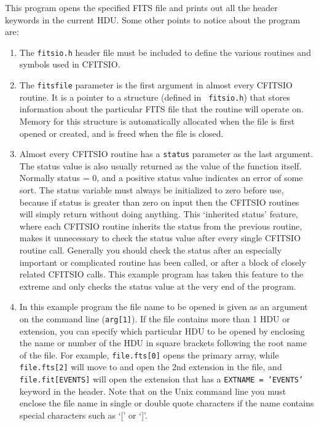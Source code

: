\documentclass[11pt]{article}
\begin{document}
This program opens the specified FITS file and prints
out all the header keywords in the current HDU.
Some other points to notice about the program are:
\begin{enumerate}

\item
The {\tt fitsio.h} header file must be included to define the
various routines and symbols used in CFITSIO.

\item

The {\tt fitsfile}  parameter is the first argument in almost every
CFITSIO routine.  It is a pointer to a structure (defined in {\tt
fitsio.h}) that stores information about the particular FITS file that
the routine will operate on.  Memory for this structure is
automatically allocated when the file is first opened or created, and
is freed when the file is closed.

\item
Almost every CFITSIO routine has a {\tt status} parameter as the last
argument. The status value is also usually returned as the value of the
function itself.  Normally status = 0, and a positive status value
indicates an error of some sort.  The status variable must always be
initialized to zero before use, because if status is greater than zero
on input then the CFITSIO routines will simply return without doing
anything.  This `inherited status' feature, where each CFITSIO routine
inherits the status from the previous routine, makes it unnecessary to
check the status value after every single CFITSIO routine call.
Generally you should check the status after an especially important or
complicated routine has been called, or after a block of
closely related CFITSIO calls.  This example program has taken this
feature to the extreme and only checks the status value at the
very end of the program.

\item

In this example program the file name to be opened is given as an
argument on the command line ({\tt arg[1]}).  If the file contains more
than 1 HDU or extension, you can specify which particular HDU to be
opened by enclosing the name or number of the HDU in square brackets
following the root name of the file.  For example, {\tt file.fts[0]}
opens the  primary array, while {\tt file.fts[2]} will move to and open
the 2nd extension in the file, and {\tt file.fit[EVENTS]} will open the
extension that has a {\tt EXTNAME = 'EVENTS'} keyword in the header.
Note that on the Unix command line you must enclose the file name in
single or double quote characters if the name contains special
characters such as `[' or `]'.


\end{enumerate}
\end{document}
